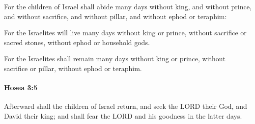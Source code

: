 			\begin{versebox}
					\item[BHS] 
					\item[LXX] 
					\item[ASV] For the children of Israel shall abide many days without king, and without prince, and without sacrifice, and without pillar, and without ephod or teraphim:
					\item[NIV] For the Israelites will live many days without king or prince, without sacrifice or sacred stones, without ephod or household gods.
					\item[NRSV] For the Israelites shall remain many days without king or prince, without sacrifice or pillar, without ephod or teraphim.
			\end{versebox}

		\paragraph{Hosea 3:5} %
			\label{HOSEA-3-5}

			Afterward shall the children of Israel return, and seek the LORD their God, and David their king; and shall fear the LORD and his goodness in the latter days.

